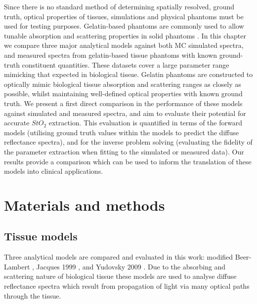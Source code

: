 Since there is no standard method of determining spatially resolved, ground truth, optical properties of tissues, 
simulations and physical
phantoms must be used
for testing purposes.
Gelatin-based phantoms are commonly used to allow tunable absorption and scattering properties in solid phantoms \cite{Pogue2006, Gautam2023}.
%
In this chapter we compare three major analytical models against both MC simulated spectra, and measured spectra from gelatin-based tissue phantoms with known ground-truth constituent quantities. These datasets cover a large parameter range mimicking that expected in biological tissue\cite{Jacques2013}. Gelatin phantoms are constructed to optically mimic biological tissue absorption and scattering ranges as closely as possible, whilst maintaining well-defined optical properties with known ground truth. We present a first direct comparison in the performance of these models against simulated and measured spectra, and aim to evaluate their potential for accurate $StO_2$ extraction. This evaluation is quantified in terms of the forward models (utilising ground truth values within the models to predict the diffuse reflectance spectra), and for the inverse problem solving (evaluating the fidelity of the parameter extraction when fitting to the simulated or measured data).
Our results provide a comparison which can be used to inform the translation of these models into clinical applications.

\section{Materials and methods}\label{sec:methods}
\subsection{Tissue models}\label{sec:methodtissuemodels}
Three analytical models are compared and evaluated in this work: modified Beer-Lambert \cite{Clancy2015}, Jacques 1999 \cite{Jacques1999}, and Yudovsky 2009 \cite{Yudovsky2009}. Due to the absorbing and scattering nature of biological tissue these models are used to analyse diffuse reflectance spectra which result from propagation of light via many optical paths through the tissue.

